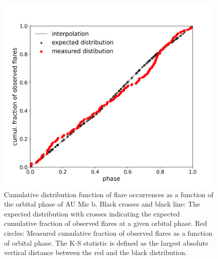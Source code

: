 \documentclass[fleqn,usenatbib,letters]{mnras}%
\begin{document}
\begin{figure}
\includegraphics[width=\hsize]{figures/2021_06_08_AUMic_KS_Test_cumdist_total_Both_Sectors_Orbit.png} 
\caption{Cumulative distribution function of flare occurrences as a function of the orbital phase of AU Mic b. Black crosses and black line: The expected distribution with crosses indicating the expected cumulative fraction of observed flares at a given orbital phase. Red circles: Measured cumulative fraction of observed flares as a function of orbital phase. The K-S statistic is defined as the largest absolute vertical distance between the red and the black distribution.}
\label{fig:cumdist}
\end{figure}
\end{document}
